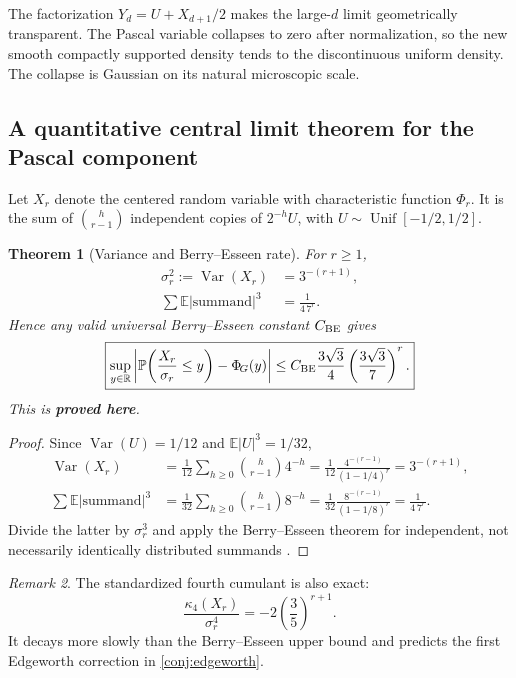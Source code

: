 \documentclass[11pt,oneside]{article}
\numberwithin{equation}{section}
\newtheorem{theorem}{Theorem}[section]
\theoremstyle{definition}
\theoremstyle{remark}
\newtheorem{remark}[theorem]{Remark}
\newcommand{\R}{\mathbb R}
\newcommand{\E}{\mathbb E}
\newcommand{\Prob}{\mathbb P}
\newcommand{\Var}{\operatorname{Var}}
\newcommand{\statusproved}{\textcolor{deepgreen}{\textbf{proved here}}}
\newcommand{\NormalCDF}{\Phi_{\!G}}
\begin{document}
The factorization $Y_d=U+X_{d+1}/2$ makes the large-$d$ limit geometrically transparent.
The Pascal variable collapses to zero after normalization, so the new smooth compactly
supported density tends to the discontinuous uniform density.  The collapse is Gaussian on
its natural microscopic scale.

\subsection{A quantitative central limit theorem for the Pascal component}

Let $X_r$ denote the centered random variable with characteristic function $\Phi_r$.  It is
the sum of $\binom h{r-1}$ independent copies of $2^{-h}U$, with
$U\sim\operatorname{Unif}[-1/2,1/2]$.

\begin{theorem}[Variance and Berry--Esseen rate]
\label{thm:pascal-BE}
For $r\ge1$,
\begin{align}
 \sigma_r^2:=\Var(X_r)&=3^{-(r+1)},
 \label{eq:pascal-variance}\\
 \sum\E|\text{summand}|^3&=\frac1{4\,7^r}.
 \label{eq:pascal-third-sum}
\end{align}
Hence any valid universal Berry--Esseen constant $C_{\rm BE}$ gives
\begin{equation}
 \boxed{
 \sup_{y\in\R}
 \left|\Prob\!\left(\frac{X_r}{\sigma_r}\le y\right)-\NormalCDF(y)\right|
 \le C_{\rm BE}\frac{3\sqrt3}{4}
       \left(\frac{3\sqrt3}{7}\right)^r.}
 \label{eq:pascal-BE}
\end{equation}
This is \statusproved.
\end{theorem}

\begin{proof}
Since $\Var(U)=1/12$ and $\E|U|^3=1/32$,
\begin{align*}
 \Var(X_r)
 &=\frac1{12}\sum_{h\ge0}\binom h{r-1}4^{-h}
 =\frac1{12}\frac{4^{-(r-1)}}{(1-1/4)^r}
 =3^{-(r+1)},\\
 \sum\E|\text{summand}|^3
 &=\frac1{32}\sum_{h\ge0}\binom h{r-1}8^{-h}
 =\frac1{32}\frac{8^{-(r-1)}}{(1-1/8)^r}
 =\frac1{4\,7^r}.
\end{align*}
Divide the latter by $\sigma_r^3$ and apply the Berry--Esseen theorem for independent,
not necessarily identically distributed summands \cite{petrov1995}.
\end{proof}

\begin{remark}
The standardized fourth cumulant is also exact:
\begin{equation}
 \frac{\kappa_4(X_r)}{\sigma_r^4}
 =-2\left(\frac35\right)^{r+1}.
 \label{eq:pascal-standardized-k4}
\end{equation}
It decays more slowly than the Berry--Esseen upper bound and predicts the first Edgeworth
correction in \cref{conj:edgeworth}.
\end{remark}
\end{document}
